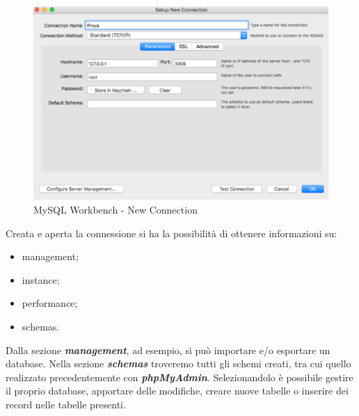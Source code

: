 \begin{center}
\begin{figure}[H]
\centering
\includegraphics[scale=0.8]{figures/mySQL_workbench_newcon.png}
\caption{MySQL Workbench - New Connection} 
\end{figure}
\end{center}

Creata e aperta la connessione si ha la possibilità di ottenere informazioni su:

\begin{itemize}

\item management;
\item instance;
\item performance;
\item schemas. 

\end{itemize}

Dalla sezione \textit{\textbf{management}}, ad esempio, si può importare e/o esportare un database. Nella sezione \textit{\textbf{schemas}} troveremo tutti gli schemi creati, tra cui quello realizzato precedentemente con \textit{\textbf{phpMyAdmin}}. Selezionandolo è possibile gestire il proprio database, apportare delle modifiche, creare nuove tabelle o inserire dei record nelle tabelle presenti. 

